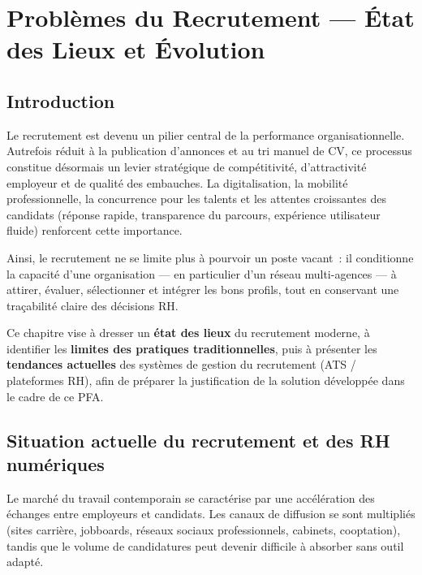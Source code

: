 \chapter{Problèmes du Recrutement --- État des Lieux et Évolution}

\section{Introduction}

Le recrutement est devenu un pilier central de la performance organisationnelle.
Autrefois réduit à la publication d'annonces et au tri manuel de CV, ce processus
constitue désormais un levier stratégique de compétitivité, d'attractivité employeur
et de qualité des embauches. La digitalisation, la mobilité professionnelle, la
concurrence pour les talents et les attentes croissantes des candidats (réponse rapide,
transparence du parcours, expérience utilisateur fluide) renforcent cette importance.

Ainsi, le recrutement ne se limite plus à pourvoir un poste vacant~: il conditionne
la capacité d'une organisation --- en particulier d'un réseau multi-agences --- à
attirer, évaluer, sélectionner et intégrer les bons profils, tout en conservant une
traçabilité claire des décisions RH.

Ce chapitre vise à dresser un \textbf{état des lieux} du recrutement moderne, à
identifier les \textbf{limites des pratiques traditionnelles}, puis à présenter les
\textbf{tendances actuelles} des systèmes de gestion du recrutement (ATS / plateformes RH),
afin de préparer la justification de la solution développée dans le cadre de ce PFA.


\section{Situation actuelle du recrutement et des RH numériques}

Le marché du travail contemporain se caractérise par une accélération des échanges
entre employeurs et candidats. Les canaux de diffusion se sont multipliés (sites
carrière, jobboards, réseaux sociaux professionnels, cabinets, cooptation), tandis
que le volume de candidatures peut devenir difficile à absorber sans outil adapté.

